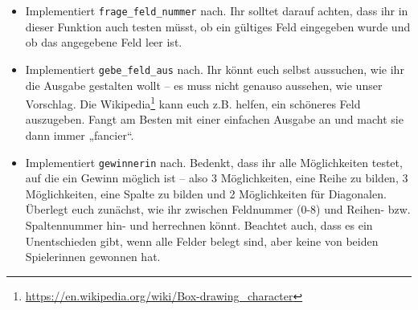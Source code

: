\begin{praxis}
    \begin{itemize}
        \item Implementiert \texttt{frage\_feld\_nummer} nach. Ihr solltet darauf
              achten, dass ihr in dieser Funktion auch testen müsst, ob ein gültiges
              Feld eingegeben wurde und ob das angegebene Feld leer ist.
        \item Implementiert \texttt{gebe\_feld\_aus} nach. Ihr könnt euch selbst
              aussuchen, wie ihr die Ausgabe gestalten wollt -- es muss nicht genauso
              aussehen, wie unser Vorschlag. Die
              Wikipedia\footnote{\url{https://en.wikipedia.org/wiki/Box-drawing_character}}
              kann euch z.B. helfen, ein schöneres Feld auszugeben. Fangt am Besten
              mit einer einfachen Ausgabe an und macht sie dann immer „fancier“.
        \item Implementiert \texttt{gewinnerin} nach. Bedenkt, dass ihr alle
              Möglichkeiten testet, auf die ein Gewinn möglich ist -- also 3
              Möglichkeiten, eine Reihe zu bilden, 3 Möglichkeiten, eine Spalte zu
              bilden und 2 Möglichkeiten für Diagonalen. Überlegt euch zunächst, wie
              ihr zwischen Feldnummer (0-8) und Reihen- bzw. Spaltennummer hin- und
              herrechnen könnt. Beachtet auch, dass es ein Unentschieden gibt, wenn
              alle Felder belegt sind, aber keine von beiden Spielerinnen gewonnen
              hat.
    \end{itemize}
\end{praxis}
